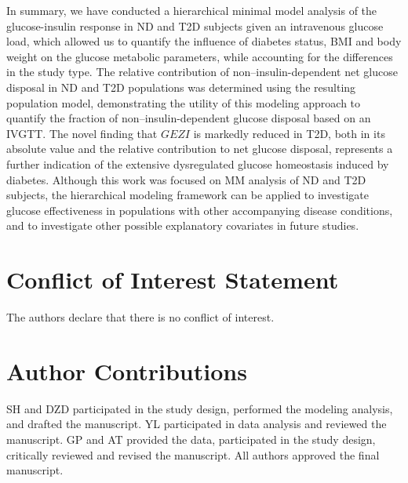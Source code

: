 \documentclass[utf8]{frontiersSCNS} %
\begin{document}
In summary, we have conducted a hierarchical minimal model analysis of the glucose-insulin response in ND and T2D subjects given an intravenous glucose load, which allowed us to quantify the influence of diabetes status, BMI and body weight on the glucose metabolic parameters, while accounting for the differences in the study type. The relative contribution of non–insulin-dependent net glucose disposal in ND and T2D populations was determined using the resulting population model, demonstrating the utility of this modeling approach to quantify the fraction of non–insulin-dependent glucose disposal based on an IVGTT. The novel finding that $GEZI$ is markedly reduced in T2D, both in its absolute value and the relative contribution to net glucose disposal, represents a further indication of the extensive dysregulated glucose homeostasis induced by diabetes. Although this work was focused on MM analysis of ND and T2D subjects, the hierarchical modeling framework can be applied to investigate glucose effectiveness in populations with other accompanying disease conditions, and to investigate other possible explanatory covariates in future studies. 

\section*{Conflict of Interest Statement}
The authors declare that there is no conflict of interest.

\section*{Author Contributions}
SH and DZD participated in the study design, performed the modeling analysis, and drafted the manuscript. YL participated in data analysis and reviewed the manuscript. GP and AT provided the data, participated in the study design, critically reviewed and revised the manuscript. All authors approved the final manuscript.
\end{document}
